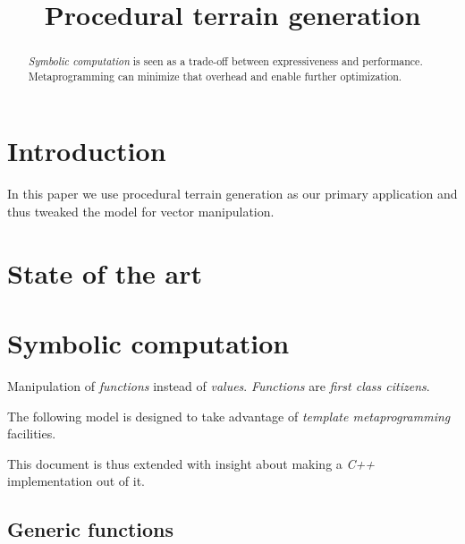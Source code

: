 \documentclass[a4paper]{article}
\title{Procedural terrain generation}
\begin{document}
\maketitle
% 
\begin{abstract}

\textit{Symbolic computation} is seen as a trade-off between expressiveness and performance.
Metaprogramming can minimize that overhead and enable further optimization. 


\end{abstract}


\section{Introduction}

In this paper we use procedural terrain generation as our primary application and thus tweaked the model for vector manipulation.

\section{State of the art}

\section{Symbolic computation}

Manipulation of \textit{functions} instead of \textit{values}.
\textit{Functions} are \textit{first class citizens}.

The following model is designed to take advantage of \textit{template metaprogramming} facilities. 

\begin{mdframed}
This document is thus extended with insight about making a \textit{C++} implementation out of it.
\end{mdframed}

\subsection{Generic functions}
\end{document}

